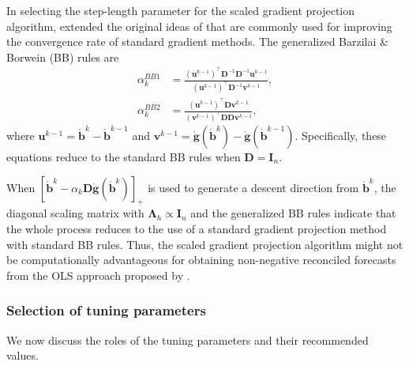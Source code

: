 \documentclass[twocolumn]{svjour3}
\begin{document}
In selecting the step-length parameter for the scaled gradient projection algorithm, \citet{Bonettini2009} extended the original ideas of \citet{Barzilai1988} that are commonly used for improving the convergence rate of standard gradient methods. The generalized Barzilai \& Borwein (BB) rules are
\begin{align*}
\alpha_{k}^{BB1} & = \frac{(\bm{u}^{k-1})^\top\bm{D}^{-1} \bm{D}^{-1} \bm{u}^{k-1}}{(\bm{u}^{k-1})^\top\bm{D}^{-1}\bm{v}^{k-1}}, \\
\alpha_{k}^{BB2} & = \frac{(\bm{u}^{k-1})^\top\bm{D}\bm{v}^{k-1}}{(\bm{v}^{k-1})^\top\bm{D}\bm{D}\bm{v}^{k-1}},
\end{align*}
where $\bm{u}^{k-1} = \mathring{\bm{b}}^{k} - \mathring{\bm{b}}^{k-1}$ and $\bm{v}^{k-1} = \mathring{\bm{g}}(\mathring{\bm{b}}^{k}) - \mathring{\bm{g}}(\mathring{\bm{b}}^{k-1})$. Specifically, these equations reduce to the standard BB rules when $\bm{D} = \bm{I}_{n}$.

When $[\mathring{\bm{b}}^{k} - \alpha_{k} \bm{D} \mathring{\bm{g}}(\mathring{\bm{b}}^{k})]_{+}$ is used to generate a descent direction from $\mathring{\bm{b}}^{k}$, the diagonal scaling matrix with $\bm{\Lambda}_{h} \propto \bm{I}_{n}$ and the generalized BB rules indicate that the whole process reduces to the use of a standard gradient projection method with standard BB rules. Thus, the scaled gradient projection algorithm might not be computationally advantageous for obtaining non-negative reconciled forecasts from the OLS approach proposed by \citet{Hyndman2011}.

\subsubsection{Selection of tuning parameters}

We now discuss the roles of the tuning parameters and their recommended values.
\end{document}
